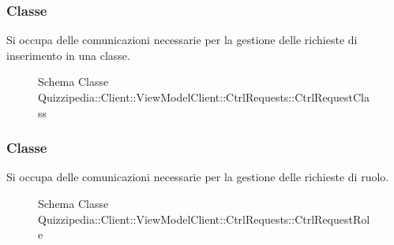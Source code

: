 \subsubsection{Classe }
Si occupa delle comunicazioni necessarie per la gestione delle richieste di inserimento in una classe.
\begin{figure}[H]
\centering
\noindent{}
\caption[Schema Classe CtrlRequestClass]{Schema Classe Quizzipedia::Client::ViewModelClient::CtrlRequests::CtrlRequestClass}
\end{figure}
\subsubsection{Classe }
Si occupa delle comunicazioni necessarie per la gestione delle richieste di ruolo.
\begin{figure}[H]
\centering
\noindent{}
\caption[Schema Classe CtrlRequestRole]{Schema Classe Quizzipedia::Client::ViewModelClient::CtrlRequests::CtrlRequestRole}
\end{figure}
